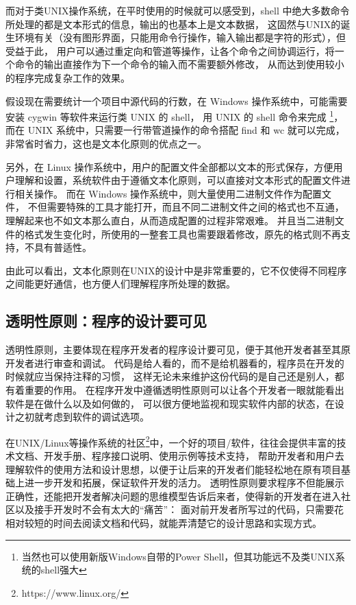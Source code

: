 \documentclass[UTF8]{ctexart}
\begin{document}
        而对于类UNIX操作系统，在平时使用的时候就可以感受到，shell 中绝大多数命令所处理的都是文本形式的信息，输出的也基本上是文本数据，
        这固然与UNIX的诞生环境有关（没有图形界面，只能用命令行操作，输入输出都是字符的形式），但受益于此，
        用户可以通过重定向和管道等操作，让各个命令之间协调运行，将一个命令的输出直接作为下一个命令的输入而不需要额外修改，
        从而达到使用较小的程序完成复杂工作的效果。

        假设现在需要统计一个项目中源代码的行数，在 Windows 操作系统中，可能需要安装 cygwin 等软件来运行类 UNIX 的 shell，
        用 UNIX 的 shell 命令来完成 \footnote{当然也可以使用新版Windows自带的Power Shell，但其功能远不及类UNIX系统的shell强大}，
        而在 UNIX 系统中，只需要一行带管道操作的命令搭配 find 和 wc 就可以完成，非常省时省力，这也是文本化原则的优点之一。

        另外，在 Linux 操作系统中，用户的配置文件全部都以文本的形式保存，方便用户理解和设置，系统软件由于遵循文本化原则，可以直接对文本形式的配置文件进行相关操作。
        而在 Windows 操作系统中，则大量使用二进制文件作为配置文件，
        不但需要特殊的工具才能打开，而且不同二进制文件之间的格式也不互通，理解起来也不如文本那么直白，从而造成配置的过程非常艰难。
        并且当二进制文件的格式发生变化时，所使用的一整套工具也需要跟着修改，原先的格式则不再支持，不具有普适性。

        由此可以看出，文本化原则在UNIX的设计中是非常重要的，它不仅使得不同程序之间能更好通信，也方便人们理解程序所处理的数据。
    \subsection{透明性原则：程序的设计要可见}
        透明性原则，主要体现在程序开发者的程序设计要可见，便于其他开发者甚至其原开发者进行审查和调试。
        代码是给人看的，而不是给机器看的，程序员在开发的时候就应当保持注释的习惯，
        这样无论未来维护这份代码的是自己还是别人，都有着重要的作用。
        在程序开发中遵循透明性原则可以让各个开发者一眼就能看出软件是在做什么以及如何做的，
        可以很方便地监视和现实软件内部的状态，在设计之初就考虑到软件的调试选项。

        在UNIX/Linux等操作系统的社区\footnote{https://www.linux.org/}中，一个好的项目/软件，往往会提供丰富的技术文档、开发手册、程序接口说明、使用示例等技术支持，
        帮助开发者和用户去理解软件的使用方法和设计思想，以便于让后来的开发者们能轻松地在原有项目基础上进一步开发和拓展，保证软件开发的活力。
        透明性原则要求程序不但能展示正确性，还能把开发者解决问题的思维模型告诉后来者，使得新的开发者在进入社区以及接手开发时不会有太大的“痛苦”：
        面对前开发者所写过的代码，只需要花相对较短的时间去阅读文档和代码，就能弄清楚它的设计思路和实现方式。
\end{document}
